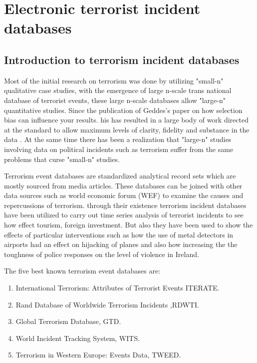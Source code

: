 \chapter{Electronic terrorist incident databases}

\section{Introduction to terrorism incident databases}
Most of the initial research on terrorism was done by utilizing "small-n" qualitative case studies, with the emergence of large n-scale trans national database of terrorist events, these large n-scale databases allow "large-n" quantitative studies. 
Since the publication of Geddes's paper on how selection bias can influence your results. his has resulted in a large body of work directed at the standard to allow maximum levels of clarity, fidelity and substance in the data \citep{geddes1990cases}. At the same time there has been a realization that "large-n" studies involving  data on political incidents such as terrorism suffer from the same problems that curse "small-n" studies.
 
Terrorism event databases are standardized analytical record sets which are mostly sourced from media articles. These databases can be joined with other data sources such as world economic forum (WEF) to examine the causes and repercussions of terrorism. through their existence terrorism incident databases have been utilized to carry out time series analysis of terrorist incidents to see how effect tourism, foreign investment. But also they have been used to show the effects of particular interventions such as how the use of metal detectors in airports had an effect on hijacking of planes and also how increasing the the toughness of police responses on the level of violence in Ireland.

The five best known terrorism event databases are:
\begin{enumerate}
\item  International Terrorism: Attributes of Terrorist Events  ITERATE.
\item Rand Database of Worldwide Terrorism Incidents ,RDWTI.
\item Global Terrorism Database, GTD.
\item World Incident Tracking System, WITS.
\item Terrorism in Western Europe: Events Data, TWEED.
\end{enumerate}

